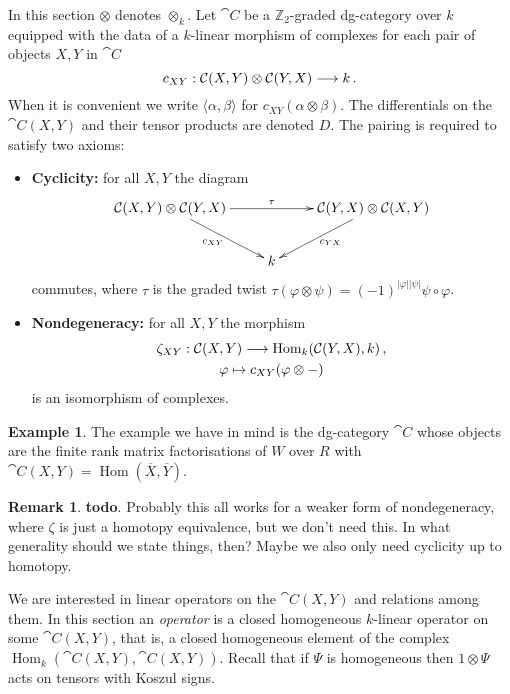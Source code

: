 \documentclass{compositio}
\theoremstyle{definition}
\newtheorem{example}[theorem]{Example}
\newtheorem{remark}[theorem]{Remark}
\numberwithin{equation}{section}
\def\Hom{\operatorname{Hom}}
\begin{document}
In this section $\otimes$ denotes $\otimes_k$. Let $\cat{C}$ be a $\mathbb{Z}_2$-graded dg-category over $k$ equipped with the data of a $k$-linear morphism of complexes for each pair of objects $X,Y$ in $\cat{C}$
\[
c_{XY}: \mathcal{C}(X,Y) \otimes \mathcal{C}(Y,X) \longrightarrow k\,.
\]
When it is convenient we write $\langle \alpha, \beta \rangle$ for $c_{XY}(\alpha \otimes \beta)$. The differentials on the $\cat{C}(X,Y)$ and their tensor products are denoted $D$. The pairing is required to satisfy two axioms:
\begin{itemize}
\item \textbf{Cyclicity:} for all $X,Y$ the diagram
\[
\xymatrix{
\cat{C}(X,Y) \otimes \cat{C}(Y,X) \ar[dr]_{c_{XY}}\ar[rr]^\tau & & \cat{C}(Y,X) \otimes \cat{C}(X,Y) \ar[dl]^{c_{YX}}\\
& k
}
\]
commutes, where $\tau$ is the graded twist $\tau( \varphi \otimes \psi) = (-1)^{|\varphi||\psi|} \psi \circ \varphi$. 
\item \textbf{Nondegeneracy:} for all $X,Y$ the morphism
\begin{gather*}
\zeta_{XY}: \cat{C}(X,Y) \lto \Hom_k( \cat{C}(Y,X), k)\,,\\
\varphi \mapsto c_{XY}( \varphi \otimes - )
\end{gather*}
is an isomorphism of complexes.
\end{itemize}

\begin{example} The example we have in mind is the dg-category $\cat{C}$ whose objects are the finite rank matrix factorisations of $W$ over $R$ with $\cat{C}(X,Y) = \Hom(\overline{X},\overline{Y})$.
\end{example}

\begin{remark} \textbf{todo}. Probably this all works for a weaker form of nondegeneracy, where $\zeta$ is just a homotopy equivalence, but we don't need this. In what generality should we state things, then? Maybe we also only need cyclicity up to homotopy.
\end{remark}

We are interested in linear operators on the $\cat{C}(X,Y)$ and relations among them. In this section an \emph{operator} is a closed homogeneous $k$-linear operator on some $\cat{C}(X,Y)$, that is, a closed homogeneous element of the complex $\Hom_k( \cat{C}(X,Y), \cat{C}(X,Y) )$. Recall that if $\Psi$ is homogeneous then $1 \otimes \Psi$ acts on tensors with Koszul signs.
\end{document}
